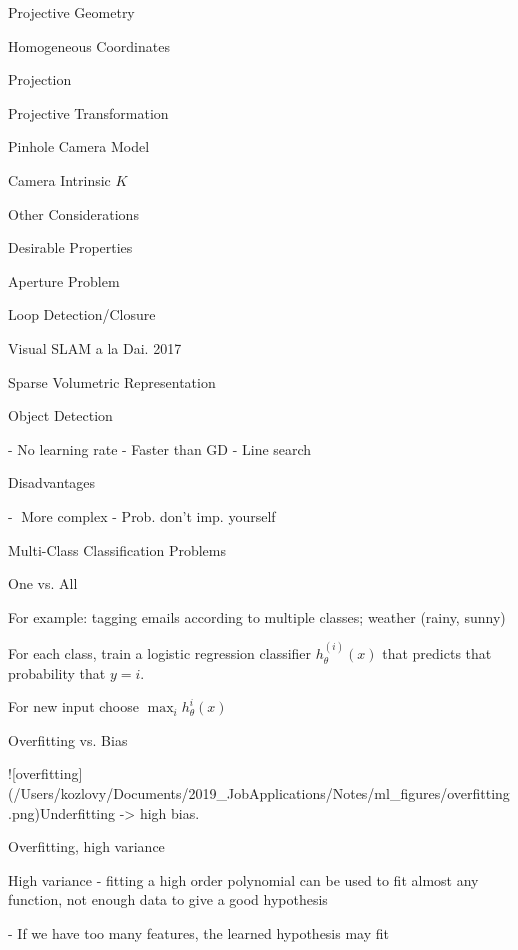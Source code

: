 \begin{section}
\begin{subsubsection}
\begin{subsubsection}
\begin{subsubsection}
\begin{section}{Projective Geometry}
\begin{subsection}{Homogeneous Coordinates}
\begin{subsubsection}
{\begin{subsubsection}{Projection}
\begin{subsubsection}{Projective Transformation}
\begin{subsection}
\begin{subsubsection}
\begin{subsubsection}
\begin{subsubsection}
{\begin{subsubsection}
\begin{subsection}
\begin{subsection} {Pinhole Camera Model}
\begin{subsection} {Camera Intrinsic $K$}
\begin{subsection}
\begin{subsection}
\begin{subsubsection}{Other Considerations}
{\begin{subsection}
\begin{subsubsection}{Desirable Properties}
\begin{section}
\begin{subsection}
\begin{subsection}
\begin{subsection}
\begin{section}
\begin{subsection}
\begin{subsubsection}
\begin{subsubsection}
\begin{subsection}
\begin{section}
\begin{subsection}
\begin{subsubsection}{Aperture Problem}
\begin{subsubsection}
{\begin{section}
\begin{subsubsection}
\begin{subsubsection}
\begin{subsubsection}
\begin{subsection}
\begin{subsection}
\begin{subsection}
\begin{subsection}
\begin{subsection}
\begin{subsection}
\begin{subsection}
\begin{subsubsection}
{\begin{subsubsection}
{\begin{subsubsection}
\begin{section}
\begin{section}
\begin{section}
\begin{subsubsection}
\begin{subsubsection}{Loop Detection/Closure}
\begin{subsubsection}{Visual SLAM a la Dai. 2017}
\begin{subsubsection}{Sparse Volumetric Representation}
\begin{subsection}
\begin{section}{Object Detection}
\begin{subsubsection}
{\begin{subsection}
\begin{subsection}
\begin{section}
\begin{section}
\begin{subsection}
\begin{subsubsection}
\begin{subsubsection}
\begin{subsection}
\begin{subsection}
\begin{subsubsection}
\begin{subsubsection}
\begin{subsubsection}
{\begin{subsection}
\begin{subsection}
\begin{subsection}
\begin{subsection}
\begin{section}
\begin{subsection}
\begin{subsubsection}
\begin{subsubsection}
\begin{subsubsection}
\begin{subsubsection}
\begin{subsubsection}
\begin{subsubsection}
\begin{subsection}
\begin{subsubsection}
\begin{subsection}
\begin{subsection}
- No learning rate
- Faster than GD
- Line search

Disadvantages

- More complex
- Prob. don't imp. yourself

\begin{subsubsection} Multi-Class Classification Problems

\begin{subsubsection} One vs. All

For example: tagging emails according to multiple classes; weather (rainy, sunny)

For each class, train a logistic regression classifier $h_{\theta}^{(i)}(x)$ that predicts that probability that $y=i$.

For new input choose $\max_ih_\theta^i(x)$

\begin{subsection} Overfitting vs. Bias

 ![overfitting](/Users/kozlovy/Documents/2019_JobApplications/Notes/ml_figures/overfitting.png)Underfitting -> high bias. 

Overfitting, high variance

High variance - fitting a high order polynomial can be used to fit almost any function, not enough data to give a good hypothesis

- If we have too many features, the learned hypothesis may fit 
\end{subsection}
\end{subsubsection}
\end{subsubsection}
\end{subsection}
\end{subsection}
\end{subsubsection}
\end{subsection}
\end{subsubsection}
\end{subsubsection}
\end{subsubsection}
\end{subsubsection}
\end{subsubsection}
\end{subsubsection}
\end{subsection}
\end{section}
\end{subsection}
\end{subsection}
\end{subsection}
\end{subsection}}
\end{subsubsection}
\end{subsubsection}
\end{subsubsection}
\end{subsection}
\end{subsection}
\end{subsubsection}
\end{subsubsection}
\end{subsection}
\end{section}
\end{section}
\end{subsection}
\end{subsection}}
\end{subsubsection}
\end{section}
\end{subsection}
\end{subsubsection}
\end{subsubsection}
\end{subsubsection}
\end{subsubsection}
\end{section}
\end{section}
\end{section}
\end{subsubsection}}
\end{subsubsection}}
\end{subsubsection}
\end{subsection}
\end{subsection}
\end{subsection}
\end{subsection}
\end{subsection}
\end{subsection}
\end{subsection}
\end{subsubsection}
\end{subsubsection}
\end{subsubsection}
\end{section}}
\end{subsubsection}
\end{subsubsection}
\end{subsection}
\end{section}
\end{subsection}
\end{subsubsection}
\end{subsubsection}
\end{subsection}
\end{section}
\end{subsection}
\end{subsection}
\end{subsection}
\end{section}
\end{subsubsection}
\end{subsection}}
\end{subsubsection}
\end{subsection}
\end{subsection}
\end{subsection}
\end{subsection}
\end{subsection}
\end{subsubsection}}
\end{subsubsection}
\end{subsubsection}
\end{subsubsection}
\end{subsection}
\end{subsubsection}
\end{subsubsection}}
\end{subsubsection}
\end{subsection}
\end{section}
\end{subsubsection}
\end{subsubsection}
\end{subsubsection}
\end{section}
